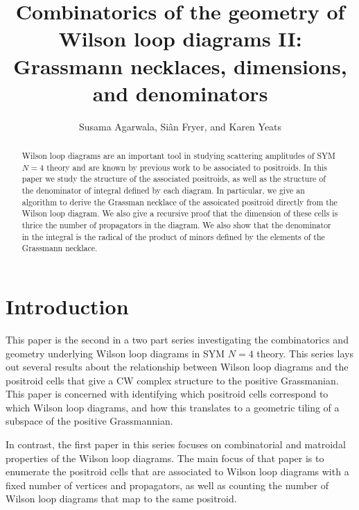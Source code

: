\documentclass[11pt]{article}
\title{Combinatorics of the geometry of Wilson loop diagrams II: Grassmann necklaces, dimensions, and denominators}
\author{Susama Agarwala, Si\^an Fryer, and Karen Yeats}
\theoremstyle{remark}
\theoremstyle{definition}
\begin{document}
\maketitle

\begin{abstract}
  Wilson loop diagrams are an important tool in studying scattering amplitudes of SYM $N=4$ theory and are known by previous work to be associated to positroids. In this paper we study the structure of the associated positroids, as well as the structure of the denominator of integral defined by each diagram. In particular, we give an algorithm to derive the Grassman necklace of the assoicated positroid directly from the Wilson loop diagram. We also give a recursive proof that the dimension of these cells is thrice the number of propagators in the diagram. We also show that the denominator in the integral is the radical of the product of minors defined by the elements of the Grassmann necklace.
\end{abstract}
\section{Introduction}


This paper is the second in a two part series investigating the combinatorics and geometry underlying Wilson loop diagrams in SYM $N=4$ theory. This series lays out several results about the relationship between Wilson loop diagrams and the positroid cells that give a CW complex structure to the positive Grassmanian. This paper is concerned with identifying which positroid cells correspond to which Wilson loop diagrams, and how this translates to a geometric tiling of a subspace of the positive Grassmannian. 



In contrast, the first paper in this series focuses on combinatorial and matroidal properties of the Wilson loop diagrams. The main focus of that paper is to enumerate the positroid cells that are associated to Wilson loop diagrams with a fixed number of vertices and propagators, as well as counting the number of Wilson loop diagrams that map to the same positroid.
\end{document}
